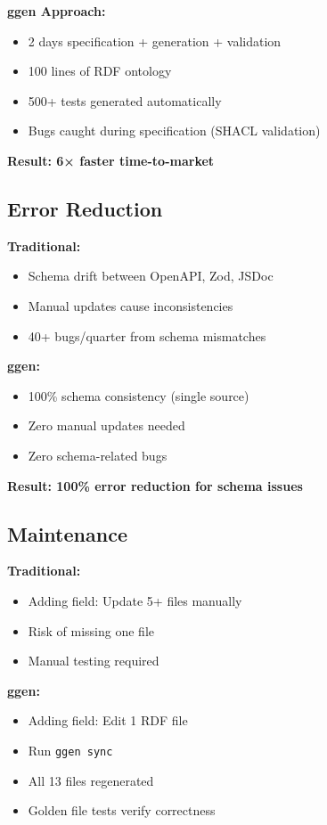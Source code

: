 \textbf{ggen Approach:}
\begin{itemize}
    \item 2 days specification + generation + validation
    \item 100 lines of RDF ontology
    \item 500+ tests generated automatically
    \item Bugs caught during specification (SHACL validation)
\end{itemize}

\textbf{Result: 6× faster time-to-market}

\subsection{Error Reduction}

\textbf{Traditional:}
\begin{itemize}
    \item Schema drift between OpenAPI, Zod, JSDoc
    \item Manual updates cause inconsistencies
    \item 40+ bugs/quarter from schema mismatches
\end{itemize}

\textbf{ggen:}
\begin{itemize}
    \item 100\% schema consistency (single source)
    \item Zero manual updates needed
    \item Zero schema-related bugs
\end{itemize}

\textbf{Result: 100\% error reduction for schema issues}

\subsection{Maintenance}

\textbf{Traditional:}
\begin{itemize}
    \item Adding field: Update 5+ files manually
    \item Risk of missing one file
    \item Manual testing required
\end{itemize}

\textbf{ggen:}
\begin{itemize}
    \item Adding field: Edit 1 RDF file
    \item Run \texttt{ggen sync}
    \item All 13 files regenerated
    \item Golden file tests verify correctness
\end{itemize}

